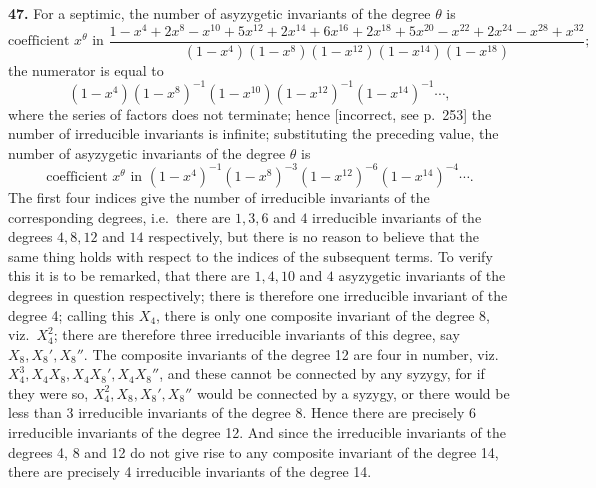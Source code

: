 \documentclass[11pt]{article}
\begin{document}
\textbf{47.} For a septimic, the number of asyzygetic invariants of the degree $\theta$ is
\[
\text{coefficient } x^\theta \text{ in } \frac{1 - x^4 + 2 x^8 - x^{10} + 5 x^{12} + 2 x^{14} + 6 x^{16} + 2 x^{18} + 5 x^{20} - x^{22} + 2 x^{24} - x^{28} + x^{32}}{(1 - x^4)(1 - x^8)(1 - x^{12})(1 - x^{14})(1 - x^{18})};
\]
the numerator is equal to
\[
(1 - x^4)(1 - x^8)^{-1}(1 - x^{10})(1 - x^{12})^{-1}(1 - x^{14})^{-1}\cdots,
\]
where the series of factors does not terminate; hence [incorrect, see p.~253] the number of irreducible invariants is infinite; substituting the preceding value, the number of asyzygetic invariants of the degree $\theta$ is
\[
\text{coefficient } x^\theta \text{ in } (1 - x^4)^{-1}(1 - x^8)^{-3}(1 - x^{12})^{-6}(1 - x^{14})^{-4}\cdots.
\]
The first four indices give the number of irreducible invariants of the corresponding degrees, i.e.\ there are $1, 3, 6$ and $4$ irreducible invariants of the degrees $4, 8, 12$ and $14$ respectively, but there is no reason to believe that the same thing holds with respect to the indices of the subsequent terms. To verify this it is to be remarked, that there are $1, 4, 10$ and $4$ asyzygetic invariants of the degrees in question respectively; there is therefore one irreducible invariant of the degree 4; calling this $X_4$, there is only one composite invariant of the degree 8, viz.\ $X_4^2$; there are therefore three irreducible invariants of this degree, say $X_8, X_8', X_8''$. The composite invariants of the degree 12 are four in number, viz.\ $X_4^3, X_4 X_8, X_4 X_8', X_4 X_8''$, and these cannot be connected by any syzygy, for if they were so, $X_4^2, X_8, X_8', X_8''$ would be connected by a syzygy, or there would be less than 3 irreducible invariants of the degree 8. Hence there are precisely 6 irreducible invariants of the degree 12. And since the irreducible invariants of the degrees 4, 8 and 12 do not give rise to any composite invariant of the degree 14, there are precisely 4 irreducible invariants of the degree 14.
\end{document}
